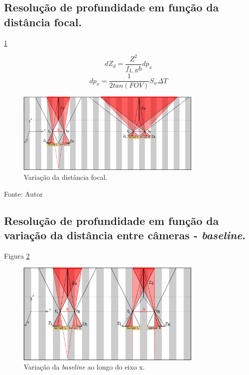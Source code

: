 \pagebreak

\subsection{Resolução de profundidade em função da distância focal.}

\ref{fig:stereo_vision_focal_variation}

$$dZ_d = \frac{Z^2}{f_{L, R}b}dp_x$$
$$dp_x = \frac{1}{2 tan(FOV)} S_w \Delta T$$

\begin{figure}[!htb]
  \centering
  \caption{Variação da distância focal.}
  \label{fig:stereo_vision_focal_variation}
  \includegraphics[width=0.80\textwidth]{./img/fundamentacao/stereo_vision_focal_variation.png}
\end{figure}

Fonte: Autor

\pagebreak

\subsection{Resolução de profundidade em função da variação da distância entre câmeras - \textit{baseline}.}

Figura \ref{fig:stereo_vision_bx_variation}

\begin{figure}[!htb]
  \centering
  \caption{Variação da \textit{baseline} ao longo do eixo x.}
  \label{fig:stereo_vision_bx_variation}
  \includegraphics[width=0.80\textwidth]{./img/fundamentacao/stereo_vision_bx_variation.png}
\end{figure}

